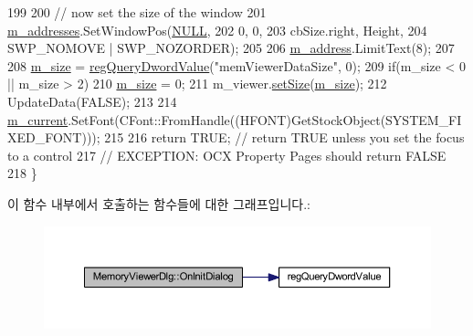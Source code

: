 \begin{DoxyCode}
199   
200   \textcolor{comment}{// now set the size of the window}
201   \mbox{\hyperlink{class_memory_viewer_dlg_ac61656d575927b23941090002e5ce996}{m\_addresses}}.SetWindowPos(\mbox{\hyperlink{getopt1_8c_a070d2ce7b6bb7e5c05602aa8c308d0c4}{NULL}},
202                            0, 0,
203                            cbSize.right, Height,
204                            SWP\_NOMOVE | SWP\_NOZORDER);
205 
206   \mbox{\hyperlink{class_memory_viewer_dlg_aef3a67a90aa1b49c204d9d6a3910f13c}{m\_address}}.LimitText(8);
207 
208   \mbox{\hyperlink{class_memory_viewer_dlg_aa24e55d166ddeecb94fea8ab7ad4d836}{m\_size}} = \mbox{\hyperlink{_reg_8cpp_a150640889ffff4851ee26d7b999ec7c3}{regQueryDwordValue}}(\textcolor{stringliteral}{"memViewerDataSize"}, 0);
209   \textcolor{keywordflow}{if}(m\_size < 0 || m\_size > 2)
210     \mbox{\hyperlink{class_memory_viewer_dlg_aa24e55d166ddeecb94fea8ab7ad4d836}{m\_size}} = 0;
211   m\_viewer.\mbox{\hyperlink{class_memory_viewer_a185cb06e604ff1e0016b9be859c21387}{setSize}}(\mbox{\hyperlink{class_memory_viewer_dlg_aa24e55d166ddeecb94fea8ab7ad4d836}{m\_size}});
212   UpdateData(FALSE);
213 
214   \mbox{\hyperlink{class_memory_viewer_dlg_a857486db87e66ac05d46733b0794aec7}{m\_current}}.SetFont(CFont::FromHandle((HFONT)GetStockObject(SYSTEM\_FIXED\_FONT)));
215   
216   \textcolor{keywordflow}{return} TRUE;  \textcolor{comment}{// return TRUE unless you set the focus to a control}
217                 \textcolor{comment}{// EXCEPTION: OCX Property Pages should return FALSE}
218 \}
\end{DoxyCode}
이 함수 내부에서 호출하는 함수들에 대한 그래프입니다.\+:
\nopagebreak
\begin{figure}[H]
\begin{center}
\leavevmode
\includegraphics[width=350pt]{class_memory_viewer_dlg_a2061415e67d04b0c157ba2bd50a8c56c_cgraph}
\end{center}
\end{figure}
\mbox{\label{class_memory_viewer_dlg_adfc256215ade1d48a24a3eb72b3ecfed}} 
